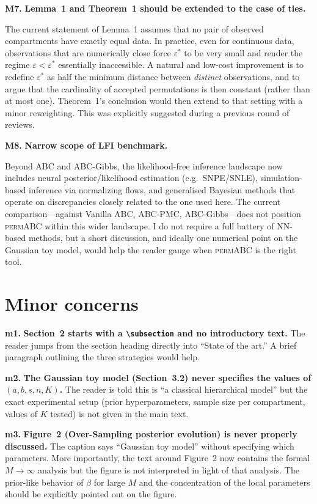 \documentclass[11pt,a4paper]{article}
\newcommand{\major}[1]{\textbf{\color{red!70!black}M#1.}}
\newcommand{\minor}[1]{\textbf{\color{orange!80!black}m#1.}}
\begin{document}
\major{7} \textbf{Lemma~1 and Theorem~1 should be extended to the case of ties.}

The current statement of Lemma~1 assumes that no pair of observed compartments have exactly equal data. In practice, even for continuous data, observations that are numerically close force $\varepsilon^*$ to be very small and render the regime $\varepsilon<\varepsilon^*$ essentially inaccessible. A natural and low-cost improvement is to redefine $\varepsilon^*$ as half the minimum distance between \emph{distinct} observations, and to argue that the cardinality of accepted permutations is then constant (rather than at most one). Theorem~1's conclusion would then extend to that setting with a minor reweighting. This was explicitly suggested during a previous round of reviews.

\major{8} \textbf{Narrow scope of LFI benchmark.}

Beyond ABC and ABC-Gibbs, the likelihood-free inference landscape now includes neural posterior/likelihood estimation (e.g.\ SNPE/SNLE), simulation-based inference via normalizing flows, and generalised Bayesian methods that operate on discrepancies closely related to the one used here. The current comparison---against Vanilla ABC, ABC-PMC, ABC-Gibbs---does not position \textsc{permABC} within this wider landscape. I do not require a full battery of NN-based methods, but a short discussion, and ideally one numerical point on the Gaussian toy model, would help the reader gauge when \textsc{permABC} is the right tool.

\section*{Minor concerns}

\minor{1} \textbf{Section~2 starts with a \texttt{\textbackslash subsection} and no introductory text.} The reader jumps from the section heading directly into ``State of the art.'' A brief paragraph outlining the three strategies would help.

\minor{2} \textbf{The Gaussian toy model (Section~3.2) never specifies the values of $(a, b, s, n, K)$.} The reader is told this is ``a classical hierarchical model'' but the exact experimental setup (prior hyperparameters, sample size per compartment, values of $K$ tested) is not given in the main text.

\minor{3} \textbf{Figure~2 (Over-Sampling posterior evolution) is never properly discussed.} The caption says ``Gaussian toy model'' without specifying which parameters. More importantly, the text around Figure~2 now contains the formal $M \to \infty$ analysis but the figure is not interpreted in light of that analysis. The prior-like behavior of $\beta$ for large $M$ and the concentration of the local parameters should be explicitly pointed out on the figure.
\end{document}
